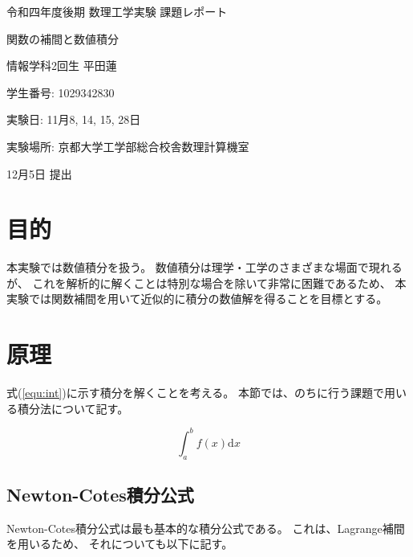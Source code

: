 \documentclass[a4j, titlepage]{jsarticle}
\numberwithin{equation}{section}
\begin{document}
\begin{titlepage}
    \begin{center}
        {\Large 令和四年度後期 数理工学実験 課題レポート}

        \vspace*{180truept}

        {\Huge 関数の補間と数値積分}

        \vspace{160truept}

        {\Large 情報学科2回生 平田蓮}

        \vspace{10truept}

        {\large 学生番号: 1029342830}

        \vspace{60truept}

        {\large 実験日: 11月8, 14, 15, 28日}

        \vspace{10truept}

        {\large 実験場所: 京都大学工学部総合校舎数理計算機室}

        \vspace{60truept}

        {\large 12月5日 提出}
    \end{center}
\end{titlepage}

\tableofcontents
\clearpage

\section{目的}
    本実験では数値積分を扱う。
    数値積分は理学・工学のさまざまな場面で現れるが、
    これを解析的に解くことは特別な場合を除いて非常に困難であるため、
    本実験では関数補間を用いて近似的に積分の数値解を得ることを目標とする。

\section{原理}
    式(\ref{equ:int})に示す積分を解くことを考える。
    本節では、のちに行う課題で用いる積分法について記す。

    \begin{equation}
        \int_a^bf(x)\mathrm{d}x \label{equ:int}
    \end{equation}

    \subsection{Newton-Cotes積分公式}
        Newton-Cotes積分公式は最も基本的な積分公式である。
        これは、Lagrange補間を用いるため、
        それについても以下に記す。
\end{document}
